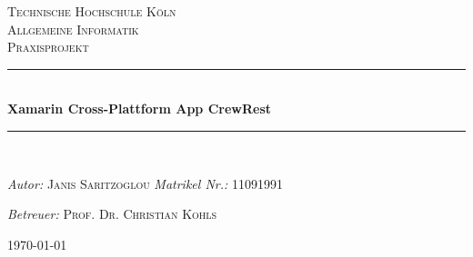 \begin{titlepage}
\newcommand{\HRule}{\rule{\linewidth}{0.5mm}}
\center
\textsc{\LARGE Technische Hochschule Köln} \\[1.5cm]
\textsc{\Large Allgemeine Informatik} \\[0.5cm]
\textsc{\large Praxisprojekt} \\
\HRule  \\[0.4cm]
{ \huge \bfseries Xamarin Cross-Plattform App CrewRest} \\[0.4cm]
\HRule  \\[1.5cm]
\vfill
\begin{minipage}[t]{0.4\textwidth}
    \begin{flushleft} \large
        \emph{Autor:} \newline
        \textsc{Janis Saritzoglou}
        \newline
        \emph{Matrikel Nr.:}
        \textsc{11091991}
    \end{flushleft}
\end{minipage}
\hfill
\begin{minipage}[t]{0.5\textwidth}
    \begin{flushright} \large
        \emph{Betreuer:} \newline
        \textsc{Prof. Dr. Christian Kohls}
    \end{flushright}
\end{minipage}
\vfill
{\large \today}
\end{titlepage}
